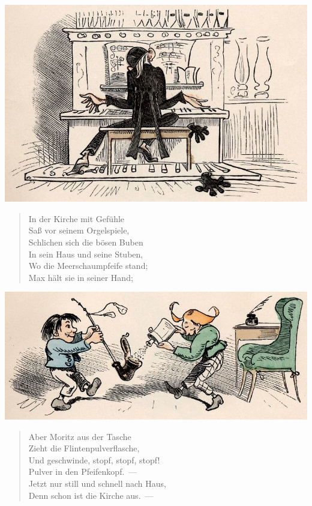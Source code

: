 \documentclass[a4paper,12pt]{article}
\begin{document}
\begin{center}\includegraphics[scale=.7, alt={an der Orgel}]{images/4-02.jpg}\end{center}



\begin{verse}
In der Kirche mit Gefühle\\{}
Saß vor seinem Orgelspiele,\\{}
Schlichen sich die bösen Buben\\{}
In sein Haus und seine Stuben,\\{}
Wo die Meerschaumpfeife stand;\\{}
Max hält sie in seiner Hand;
\end{verse}



\begin{center}\includegraphics[scale=.7, alt={Max und Moritz mit der Pulverflasche}]{images/4-03.jpg}\end{center}



\begin{verse}
Aber Moritz aus der Tasche\\{}
Zieht die Flintenpulverflasche,\\{}
Und geschwinde, stopf, stopf, stopf!\\{}
Pulver in den Pfeifenkopf.~—\\{}
Jetzt nur still und schnell nach Haus,\\{}
Denn schon ist die Kirche aus.~—
\end{verse}
\end{document}
